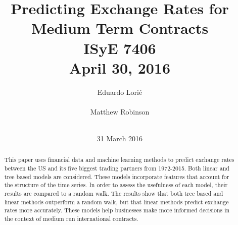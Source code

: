 \documentclass{sig-alternate-05-2015}
\begin{document}


\title{{Predicting Exchange Rates for Medium Term Contracts} \\
ISyE 7406 \\
April 30, 2016
}
\author{
\alignauthor
Eduardo Lori\'{e}\\
       \\
\alignauthor 
Matthew Robinson \\
       \\
}

\date{31 March 2016}

\maketitle

\begin{abstract}
This paper uses financial data and machine learning methods to predict exchange rates between the US and its five biggest trading partners from 1972-2015. Both linear and tree based models are considered. These models incorporate features that account for the structure of the time series. In order to assess the usefulness of each model, their results are compared to a random walk. The results show that both tree based and linear methods outperform a random walk, but that linear methods predict exchange rates more accurately. These models help businesses make more informed decisions in the context of medium run international contracts.
\end{abstract}
\end{document}
